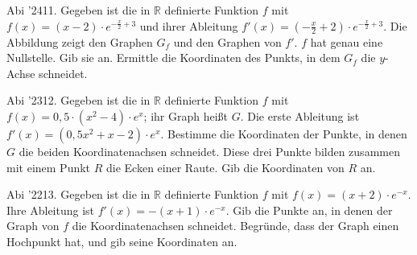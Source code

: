 \documentclass[11pt]{article}
\begin{document}
\pfgruppe{}
\begin{pfaufg}{Abi ’24}{11.}{}
Gegeben ist die in $\mathbb{R}$ definierte Funktion $f$ mit $f(x) = (x - 2)\cdot e^{-\tfrac{x}{2} + 3}$ und ihrer Ableitung $f'(x) = \left(-\tfrac{x}{2} + 2\right)\cdot e^{-\tfrac{x}{2} + 3}$. Die Abbildung zeigt den Graphen $G_f$ und den Graphen von $f'$. $f$ hat genau eine Nullstelle. Gib sie an. Ermittle die Koordinaten des Punkts, in dem $G_f$ die $y$-Achse schneidet.
\par\smallskip\noindent {}\par
{}
\end{pfaufg}
\pfgruppe{}
\begin{pfaufg}{Abi ’23}{12.}{}
Gegeben ist die in $\mathbb{R}$ definierte Funktion $f$ mit $f(x) = 0{,}5\cdot(x^2 - 4)\cdot e^x$; ihr Graph heißt $G$. Die erste Ableitung ist $f'(x) = (0{,}5x^2 + x - 2)\cdot e^x$. Bestimme die Koordinaten der Punkte, in denen $G$ die beiden Koordinatenachsen schneidet. Diese drei Punkte bilden zusammen mit einem Punkt $R$ die Ecken einer Raute. Gib die Koordinaten von $R$ an.
\end{pfaufg}
\pfgruppe{}
\begin{pfaufg}{Abi ’22}{13.}{}
Gegeben ist die in $\mathbb{R}$ definierte Funktion $f$ mit $f(x) = (x + 2)\cdot e^{-x}$. Ihre Ableitung ist $f'(x) = -(x + 1)\cdot e^{-x}$. Gib die Punkte an, in denen der Graph von $f$ die Koordinatenachsen schneidet. Begründe, dass der Graph einen Hochpunkt hat, und gib seine Koordinaten an.
\end{pfaufg}
\end{document}
